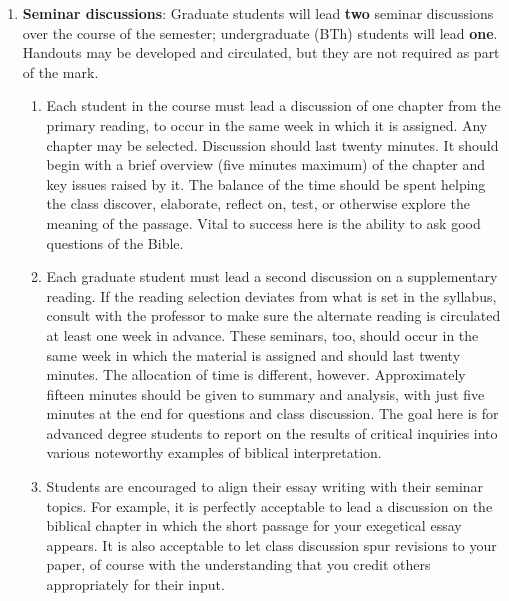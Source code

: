 \documentclass[titlepage]{article}
\begin{document}
\begin{enumerate}
	\item \textbf{Seminar discussions}: Graduate students will lead
	\textbf{two} seminar discussions over the course of the semester;
	undergraduate (BTh) students will lead \textbf{one}. Handouts may be
	developed and circulated, but they are not required as part of the mark.


	\begin{enumerate}

		\item Each student in the course must lead a discussion of one
		chapter from the primary reading, to occur in the same week in which
		it is assigned. Any chapter may be selected. Discussion should last
		twenty minutes. It should begin with a brief overview (five minutes
		maximum) of the chapter and key issues raised by it. The balance of
		the time should be spent helping the class discover, elaborate,
		reflect on, test, or otherwise explore the meaning of the passage.
		Vital to success here is the ability to ask good questions of the
		Bible.

		\item Each graduate student must lead a second discussion on a
		supplementary reading. If the reading selection deviates from what
		is set in the syllabus, consult with the professor to make sure the
		alternate reading is circulated at least one week in advance. These
		seminars, too, should occur in the same week in which the material
		is assigned and should last twenty minutes. The allocation of time
		is different, however. Approximately fifteen minutes should be given
		to summary and analysis, with just five minutes at the end for
		questions and class discussion. The goal here is for advanced degree
		students to report on the results of critical inquiries into various
		noteworthy examples of biblical interpretation.

		\item Students are encouraged to align their essay writing with
		their seminar topics. For example, it is perfectly acceptable to
		lead a discussion on the biblical chapter in which the short passage
		for your exegetical essay appears. It is also acceptable to let
		class discussion spur revisions to your paper, of course with the
		understanding that you credit others appropriately for their input.

	\end{enumerate}

\end{enumerate}
\end{document}
